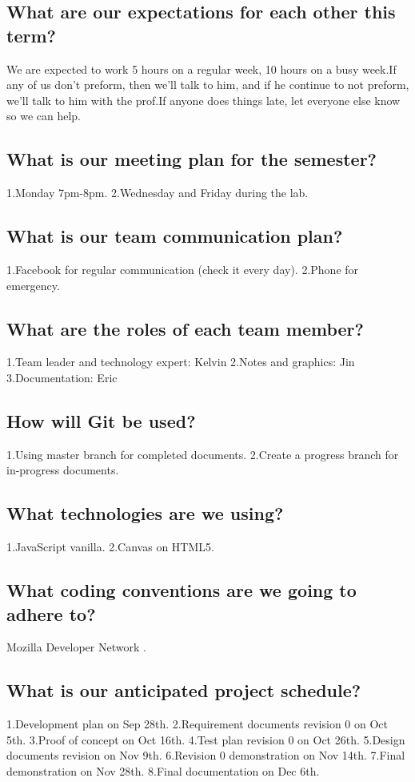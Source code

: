 \documentclass[11pt]{meetingmins}
\begin{document}
	\subsection{What are our expectations for each other this term?}
		We are expected to work 5 hours on a regular week, 10 hours on a busy week.If any of us don't preform, then we'll talk to him, and if he 			continue to not preform, we'll talk to him with the prof.If anyone does things late, let everyone else know so we can help.
		

		
	\subsection{What is our meeting plan for the semester?}
		1.Monday 7pm-8pm.  
		2.Wednesday and Friday during the lab.

		
	\subsection{What is our team communication plan?}
		1.Facebook for regular communication (check it every day).
		2.Phone for emergency.

		
	\subsection{What are the roles of each team member?}
		1.Team leader and technology expert: Kelvin
		2.Notes and graphics: Jin 
		3.Documentation: Eric
		
	\subsection{How will Git be used?}
		1.Using master branch for completed documents.
		2.Create a progress branch for in-progress documents.

		
	\subsection{What technologies are we using?}
		1.JavaScript vanilla.
		2.Canvas on HTML5.

	\subsection{What coding conventions are we going to adhere to?}
		Mozilla Developer Network .
		
	\subsection{What is our anticipated project schedule?}
		1.Development plan on Sep 28th.
		2.Requirement documents revision 0 on Oct 5th.
		3.Proof of concept on Oct 16th.
		4.Test plan revision 0 on Oct 26th.
		5.Design documents revision on Nov 9th.
		6.Revision 0 demonstration on Nov 14th.		
		7.Final demonstration on Nov 28th.
		8.Final documentation on Dec 6th.
\end{document}
